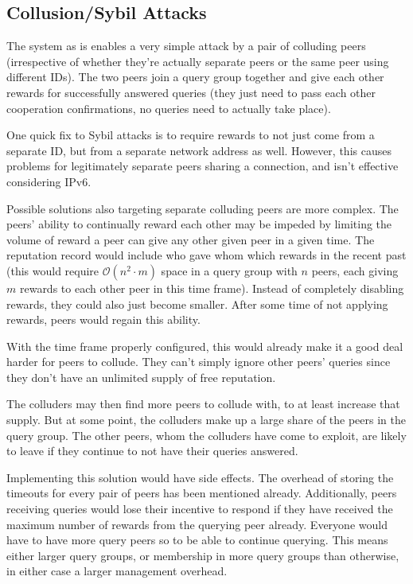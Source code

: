 \subsection{Collusion/Sybil Attacks}
\label{sec:desc_collusion_sybil_attacks}
The system as is enables a very simple attack by a pair of colluding peers
(irrespective of whether they're actually separate peers or the same peer using
different IDs). The two peers join a query group together and give each other
rewards for successfully answered queries (they just need to pass each other
cooperation confirmations, no queries need to actually take place).

One quick fix to Sybil attacks is to require rewards to not just come from a
separate ID, but from a separate network address as well. However, this causes
problems for legitimately separate peers sharing a connection, and isn't
effective considering IPv6.

Possible solutions also targeting separate colluding peers are more complex. The
peers' ability to continually reward each other may be impeded by limiting the
volume of reward a peer can give any other given peer in a given time. The
reputation record would include who gave whom which rewards in the recent past
(this would require $\mathcal{O}(n^2 \cdot m)$ space in a query group with $n$
peers, each giving $m$ rewards to each other peer in this time frame). Instead
of completely disabling rewards, they could also just become smaller. After some
time of not applying rewards, peers would regain this ability.

With the time frame properly configured, this would already make it a good deal
harder for peers to collude. They can't simply ignore other peers' queries since
they don't have an unlimited supply of free reputation.

The colluders may then find more peers to collude with, to at least increase
that supply. But at some point, the colluders make up a large share of the peers
in the query group. The other peers, whom the colluders have come to exploit,
are likely to leave if they continue to not have their queries answered.

Implementing this solution would have side effects. The overhead of storing the
timeouts for every pair of peers has been mentioned already. Additionally, peers
receiving queries would lose their incentive to respond if they have received
the maximum number of rewards from the querying peer already. Everyone would
have to have more query peers so to be able to continue querying. This means
either larger query groups, or membership in more query groups than otherwise,
in either case a larger management overhead.

